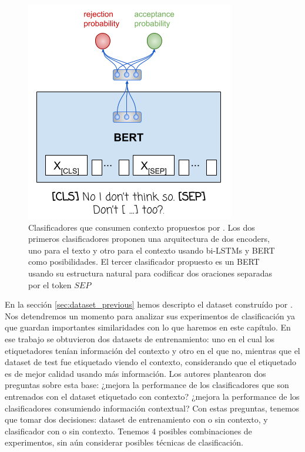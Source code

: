 \begin{figure}[t]
    \begin{minipage}[b]{0.35\textwidth}
        \includegraphics[width=\textwidth]{img/pavlopoulos_bert_sep_classifier.png}
    \end{minipage}


    \caption{Clasificadores que consumen contexto propuestos por \citet{pavlopoulos2020toxicity}. Los dos primeros clasificadores proponen una arquitectura de dos encoders, uno para el texto y otro para el contexto usando bi-LSTMs y BERT como posibilidades. El tercer clasificador propuesto es un BERT usando su estructura natural para codificar dos oraciones separadas por el token $SEP$ }
    \label{fig:pavlopoulos_classifiers}
\end{figure}


En la sección \ref{sec:dataset_previous} hemos descripto el dataset construído por \citet{pavlopoulos2020toxicity}. Nos detendremos un momento para analizar sus experimentos de clasificación ya que guardan importantes similaridades con lo que haremos en este capítulo. En ese trabajo se obtuvieron dos datasets de entrenamiento: uno en el cual los etiquetadores tenían información del contexto y otro en el que no, mientras que el dataset de test fue etiquetado viendo el contexto, considerando que el etiquetado es de mejor calidad usando más información. Los autores plantearon dos preguntas sobre esta base: ¿mejora la performance de los clasificadores que son entrenados con el dataset etiquetado con contexto? ¿mejora la performance de los clasificadores consumiendo información contextual? Con estas preguntas, tenemos que tomar dos decisiones: dataset de entrenamiento con o sin contexto, y clasificador con o sin contexto. Tenemos 4 posibles combinaciones de experimentos, sin aún considerar posibles técnicas de clasificación.

